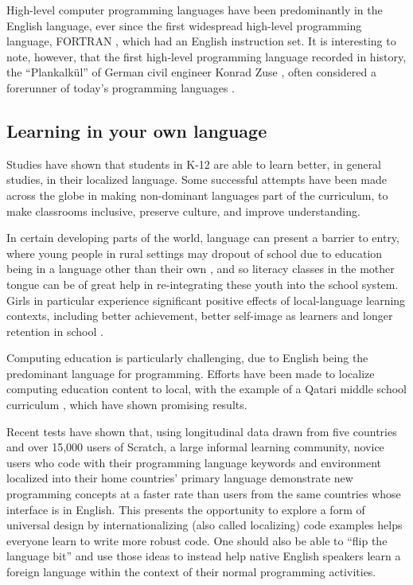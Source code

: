 \documentclass[conference]{IEEEtran}
\begin{document}
High-level computer programming languages have been predominantly in the English language, ever since the first widespread high-level programming language, FORTRAN \cite{backus1978history}, which had an English instruction set. It is interesting to note, however, that the first high-level programming language recorded in history, the “Plankalkül” of German civil engineer Konrad Zuse \cite{zuse1963ansaetze}, often considered a forerunner of today's programming languages \cite{bauer1972plankalkul}.

\subsection{Learning in your own language}

Studies have shown that students in K-12 are able to learn better, in general studies, in their localized language. \cite{buhmann2008mother} Some successful attempts have been made across the globe in making non-dominant languages part of the curriculum, to make classrooms inclusive, preserve culture, and improve understanding. \cite{taylor2015finding}

In certain developing parts of the world, language can present a barrier to entry, where young people in rural settings may dropout of school due to education being in a language other than their own \cite{trudell2009local}, and so literacy classes in the mother tongue can be of great help in re-integrating these youth into the school
system. Girls in particular experience significant positive effects of
local-language learning contexts, including better achievement,
better self-image as learners and longer retention in school
\cite{unescobangkok2005mothertongue}.

Computing education is particularly challenging, due to English being the predominant language for programming. Efforts have been made to localize computing education content to local, with the example of a Qatari middle school curriculum \cite{localized_content}, which have shown promising results.

Recent tests have shown that, using longitudinal data drawn from five countries and over 15,000 users of Scratch, a large informal learning community, novice users who code with their programming language keywords and environment localized into their home countries' primary language demonstrate new programming concepts at a faster rate than users from the same countries whose interface is in English. \cite{dasgupta2017learning} This presents the opportunity to explore a form of universal design \cite{universaldesign} by internationalizing (also called localizing) code examples helps everyone learn to write more robust
  code. One should also be able to “flip the language bit” and use those ideas to
  instead help native English speakers learn a foreign language within the context of their normal programming activities.\cite{NonNative_English_Speakers}
\end{document}
